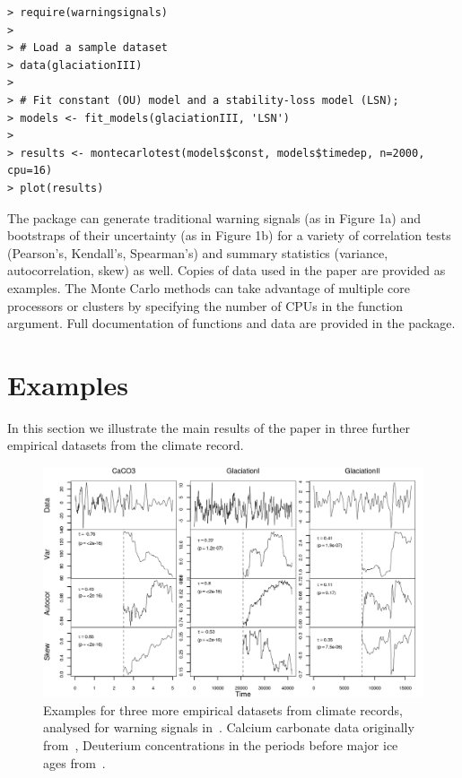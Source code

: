 \documentclass[authoryear, preprint,review,12pt]{elsarticle}
\begin{document}
\begin{verbatim}
> require(warningsignals)
>
> # Load a sample dataset
> data(glaciationIII)
>
> # Fit constant (OU) model and a stability-loss model (LSN);
> models <- fit_models(glaciationIII, 'LSN')
>
> results <- montecarlotest(models$const, models$timedep, n=2000, cpu=16)
> plot(results)
\end{verbatim}

The package can generate traditional warning signals (as in Figure 1a) and bootstraps of their uncertainty (as in Figure 1b) for a variety of correlation tests (Pearson's, Kendall's, Spearman's) and summary statistics (variance, autocorrelation, skew) as well.  Copies of data used in the paper are provided as examples.  The Monte Carlo methods can take advantage of multiple core processors or clusters by specifying the number of CPUs in the function argument.   Full documentation of functions and data are provided in the package.  

\section{Examples}\label{examples}
In this section we illustrate the main results of the paper in three further empirical datasets from the climate record.  
\begin{figure}[hb]
\begin{center}
\includegraphics[width=\textwidth]{appendix_fig1}
\end{center}
\caption{Examples for three more empirical datasets from climate records, analysed for warning signals in~\citet{Dakos2008}.  Calcium carbonate data originally from~\citet{Tripati2005}, Deuterium concentrations in the periods before major ice ages from~\citet{Petit1999}.}
\label{fig:1a}
\end{figure}
\end{document}
